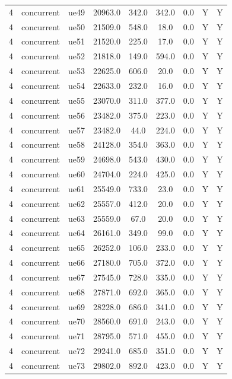\begin{table}[ht]
\begin{tabular}{|c|c|c|c|c|c|c|c|c|}
4 & concurrent & ue49 & 20963.0 & 342.0 & 342.0 & 0.0 & Y & Y \\
4 & concurrent & ue50 & 21509.0 & 548.0 & 18.0 & 0.0 & Y & Y \\
4 & concurrent & ue51 & 21520.0 & 225.0 & 17.0 & 0.0 & Y & Y \\
4 & concurrent & ue52 & 21818.0 & 149.0 & 594.0 & 0.0 & Y & Y \\
4 & concurrent & ue53 & 22625.0 & 606.0 & 20.0 & 0.0 & Y & Y \\
4 & concurrent & ue54 & 22633.0 & 232.0 & 16.0 & 0.0 & Y & Y \\
4 & concurrent & ue55 & 23070.0 & 311.0 & 377.0 & 0.0 & Y & Y \\
4 & concurrent & ue56 & 23482.0 & 375.0 & 223.0 & 0.0 & Y & Y \\
4 & concurrent & ue57 & 23482.0 & 44.0 & 224.0 & 0.0 & Y & Y \\
4 & concurrent & ue58 & 24128.0 & 354.0 & 363.0 & 0.0 & Y & Y \\
4 & concurrent & ue59 & 24698.0 & 543.0 & 430.0 & 0.0 & Y & Y \\
4 & concurrent & ue60 & 24704.0 & 224.0 & 425.0 & 0.0 & Y & Y \\
4 & concurrent & ue61 & 25549.0 & 733.0 & 23.0 & 0.0 & Y & Y \\
4 & concurrent & ue62 & 25557.0 & 412.0 & 20.0 & 0.0 & Y & Y \\
4 & concurrent & ue63 & 25559.0 & 67.0 & 20.0 & 0.0 & Y & Y \\
4 & concurrent & ue64 & 26161.0 & 349.0 & 99.0 & 0.0 & Y & Y \\
4 & concurrent & ue65 & 26252.0 & 106.0 & 233.0 & 0.0 & Y & Y \\
4 & concurrent & ue66 & 27180.0 & 705.0 & 372.0 & 0.0 & Y & Y \\
4 & concurrent & ue67 & 27545.0 & 728.0 & 335.0 & 0.0 & Y & Y \\
4 & concurrent & ue68 & 27871.0 & 692.0 & 365.0 & 0.0 & Y & Y \\
4 & concurrent & ue69 & 28228.0 & 686.0 & 341.0 & 0.0 & Y & Y \\
4 & concurrent & ue70 & 28560.0 & 691.0 & 243.0 & 0.0 & Y & Y \\
4 & concurrent & ue71 & 28795.0 & 571.0 & 455.0 & 0.0 & Y & Y \\
4 & concurrent & ue72 & 29241.0 & 685.0 & 351.0 & 0.0 & Y & Y \\
4 & concurrent & ue73 & 29802.0 & 892.0 & 423.0 & 0.0 & Y & Y \\

\end{tabular}
\end{table}
